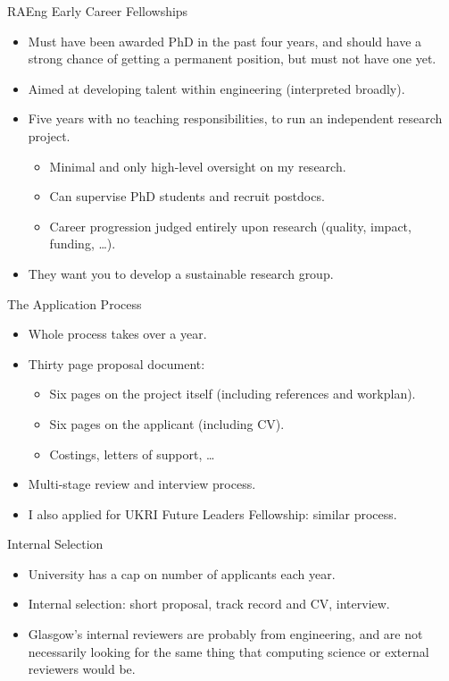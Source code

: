 \documentclass[aspectratio=169,compress,10pt]{beamer}
\begin{document}
\begin{frame}{RAEng Early Career Fellowships}
    \begin{itemize}
        \item Must have been awarded PhD in the past four years, and should have a strong
            chance of getting a permanent position, but must not have one yet.
        \item Aimed at developing talent within engineering (interpreted broadly).
        \item Five years with no teaching responsibilities, to run an independent research project.
            \begin{itemize}
                \item Minimal and only high-level oversight on my research.
                \item Can supervise PhD students and recruit postdocs.
                \item Career progression judged entirely upon research (quality, impact, funding, \ldots).
            \end{itemize}
        \item They want you to develop a sustainable research group.
    \end{itemize}
\end{frame}

\begin{frame}{The Application Process}
    \begin{itemize}
        \item Whole process takes over a year.
        \item Thirty page proposal document:
            \begin{itemize}
                \item Six pages on the project itself (including references and workplan).
                \item Six pages on the applicant (including CV).
                \item Costings, letters of support, \ldots
            \end{itemize}
        \item Multi-stage review and interview process.
        \item I also applied for UKRI Future Leaders Fellowship: similar process.
    \end{itemize}
\end{frame}

\begin{frame}{Internal Selection}
    \begin{itemize}
        \item University has a cap on number of applicants each year.
        \item Internal selection: short proposal, track record and CV, interview.
        \item Glasgow's internal reviewers are probably from engineering, and are not necessarily
            looking for the same thing that computing science or external reviewers would be.
    \end{itemize}
\end{frame}
\end{document}
